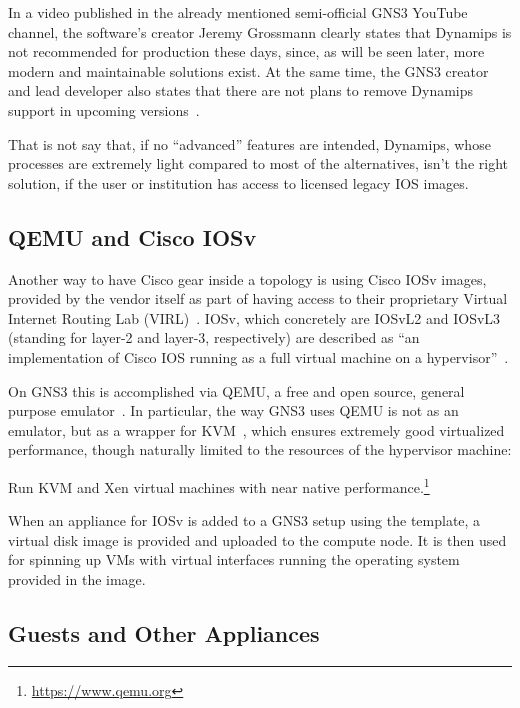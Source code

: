 In a video published in the already mentioned semi-official GNS3 YouTube channel, the software's creator Jeremy Grossmann clearly states that Dynamips is not recommended for production these days, since, as will be seen later, more modern and maintainable solutions exist. At the same time, the GNS3 creator and lead developer also states that there are not plans to remove Dynamips support in upcoming versions~\cite{ytdynamipsvpcs}.

That is not say that, if no ``advanced'' features are intended, Dynamips, whose processes are extremely light compared to most of the alternatives, isn't the right solution, if the user or institution has access to licensed legacy IOS images. %

\subsection{QEMU and Cisco IOSv}
\label{subsec:gns3ciscoiosv}

Another way to have Cisco gear inside a topology is using Cisco IOSv images, provided by the vendor itself as part of having access to their proprietary Virtual Internet Routing Lab (VIRL)~\cite{ciscovirl}.
IOSv, which concretely are IOSvL2 and IOSvL3 (standing for layer-2 and layer-3, respectively) are described as ``an implementation of Cisco IOS running as a full virtual machine on a hypervisor''~\cite{ciscoiosvinfo}.

On GNS3 this is accomplished via QEMU, a free and open source, general purpose emulator~\cite{qemu}.
In particular, the way GNS3 uses QEMU is not as an emulator, but as a wrapper for KVM~\cite{whatiskvm}, which ensures extremely good virtualized performance, though naturally limited to the resources of the hypervisor machine:
\begin{displayquote}
Run KVM and Xen virtual machines with near native performance.\footnote{\url{https://www.qemu.org}}
\end{displayquote}

When an appliance for IOSv is added to a GNS3 setup using the template, a virtual disk image is provided and uploaded to the compute node.
It is then used for spinning up VMs with virtual interfaces running the operating system provided in the image. %

\subsection{Guests and Other Appliances}
\label{subsec:gns3guestsappliances}


